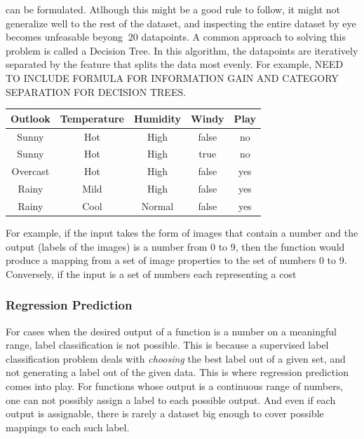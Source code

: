 can be formulated. Atlhough this might be a good rule to follow, it might not generalize well to the rest of the dataset, and inspecting the entire dataset by eye becomes unfeasable beyong $~20$ datapoints. A common approach to solving this problem is called a Decision Tree. In this algorithm, the datapoints are iteratively separated by the feature that splits the data most evenly. For example,
NEED TO INCLUDE FORMULA FOR INFORMATION GAIN AND CATEGORY SEPARATION FOR DECISION TREES.
\begin{center}
 \label{table:categorial_examples_weather}
 \begin{tabular}{||c c c c c||} 
 \hline
 Outlook & Temperature & Humidity & Windy & Play \\ [0.5ex] 
 \hline\hline
 Sunny & Hot & High & false  & no\\ 
 \hline
 Sunny & Hot & High & true  & no\\ 
 \hline
 Overcast & Hot & High & false  & yes\\ 
 \hline
 Rainy & Mild & High & false  & yes\\ 
 \hline
 Rainy & Cool & Normal & false  & yes\\ [1ex] 
 \hline
\end{tabular}
\end{center}


For example, if the input takes the form of images that contain a number and the output (labels of the images) is a number from 0 to 9, then the function would produce a mapping from a set of image properties to the set of numbers 0 to 9. Conversely, if the input is a set of numbers each representing a cost

\subsubsection{Regression Prediction}
\label{sec:regression_supervised_learning}
For cases when the desired output of a function is a number on a meaningful range, label classification is not possible. This is because a supervised label classification problem deals with \textit{choosing} the best label out of a given set, and not generating a label out of the given data. This is where regression prediction comes into play. For functions whose output is a continuous range of numbers, one can not possibly assign a label to each possible output. And even if each output is assignable, there is rarely a dataset big enough to cover possible mappings to each such label.

